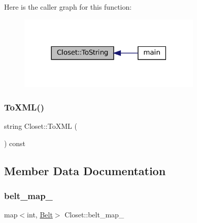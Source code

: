 Here is the caller graph for this function\+:
\nopagebreak
\begin{figure}[H]
\begin{center}
\leavevmode
\includegraphics[width=249pt]{classCloset_a3bad65dd75ada9a484eb7f78ebfa3b2a_icgraph}
\end{center}
\end{figure}
\mbox{\label{classCloset_a7642f749dfd4ad11a83c2cab5a3bdae2}} 
\subsubsection{\texorpdfstring{To\+X\+M\+L()}{ToXML()}}
{\footnotesize\ttfamily string Closet\+::\+To\+X\+ML (\begin{DoxyParamCaption}{ }\end{DoxyParamCaption}) const}



\subsection{Member Data Documentation}
\mbox{\label{classCloset_a0631fe46e3c955109a613e1cd1d2cb52}} 
\subsubsection{\texorpdfstring{belt\+\_\+map\+\_\+}{belt\_map\_}}
{\footnotesize\ttfamily map$<$int, \mbox{\hyperlink{classBelt}{Belt}}$>$ Closet\+::belt\+\_\+map\+\_\+\hspace{0.3cm}{\ttfamily [private]}}

\mbox{\label{classCloset_a3c06676b90e6ebe31d6dd276f2f0bcef}} 
